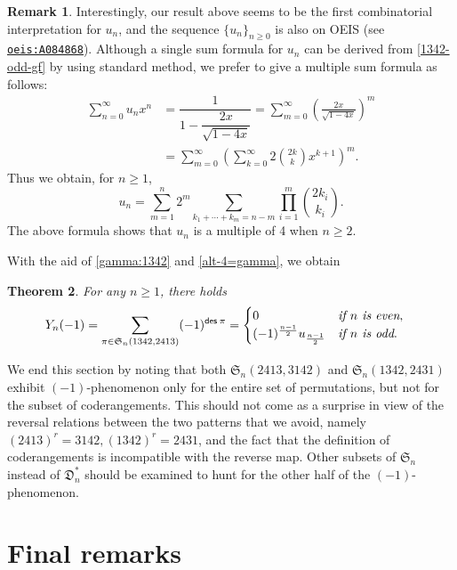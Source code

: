 \documentclass[12pt,reqno]{amsart}
\numberwithin{equation}{section}
\theoremstyle{plain}
\newtheorem{theorem}{Theorem}[section]
\theoremstyle{definition}
\newtheorem{remark}[theorem]{Remark}
\def\S{\mathfrak{S}}
\def\D{\mathfrak{D}}
\def\des{\mathsf{des}}
\begin{document}
\begin{remark}
Interestingly, our result above seems to be the first combinatorial interpretation for $u_n$, and the sequence $\{u_n\}_{n\ge 0}$ is also on OEIS (see \href{https://oeis.org/A084868}{\tt{oeis:A084868}}).
Although a single sum formula for  $u_n$ can be derived from  \eqref{1342-odd-gf}
by using standard method, we prefer to give  a multiple sum formula  as follows:
\begin{align*}
\sum_{n=0}^{\infty}u_n x^n&=\dfrac{1}{1-\dfrac{2x}{\sqrt{1-4x}}}
=\sum_{m=0}^{\infty} \left(\frac{2x}{\sqrt{1-4x}}\right)^m\\
&=\sum_{m=0}^{\infty} \left(\sum_{k=0}^{\infty} 2\binom{2k}{k} x^{k+1}\right)^m.
\end{align*}
Thus we obtain, for $n\geq 1$,
\begin{equation}\label{sum formula}
u_n=\sum_{m=1}^n 2^m \sum_{k_1+\cdots +k_m=n-m}\prod_{i=1}^m \binom{2k_i}{k_i}.
\end{equation}
The above formula shows that  $u_{n}$ is a multiple of 4 when $n\geq 2$.




\end{remark}

With the aid of \eqref{gamma:1342} and \eqref{alt-4=gamma}, we obtain
\begin{theorem}
For any $n\ge 1$, there holds
\begin{align}
\label{alt:1342}
Y_{n}(-1)=\sum_{\pi\in\S_n(1342,2413)}(-1)^{\des\:\pi}&=\begin{cases}0 & \emph{if $n$ is even},\\
(-1)^{\frac{n-1}{2}}u_{\frac{n-1}{2}} & \emph{if $n$ is odd}.
\end{cases}
\end{align}
\end{theorem}

We end this section by noting that both $\S_n(2413,3142)$ and $\S_n(1342,2431)$ exhibit $(-1)$-phenomenon only for the entire set of permutations, but not for the subset of coderangements. This should not come as a surprise in view of the reversal relations between the two patterns that we avoid, namely $(2413)^r=3142, (1342)^r=2431$, and the fact that the definition of coderangements is incompatible with the reverse map. Other subsets of $\S_n$ instead of $\D^*_n$ should be examined to hunt for the other half of the $(-1)$-phenomenon.



\section{Final remarks}
\end{document}
